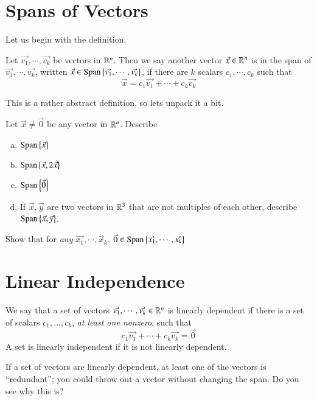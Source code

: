 \section{Spans of Vectors}

Let us begin with the definition.
\begin{Def}
  Let $\vec{v_1},\cdots,\vec{v_k}$ be vectors in $\mathbb{R}^n$.
  Then we say another vector $\vec{x}\in\mathbb{R}^n$ is in the span of $\vec{v_1},\cdots,\vec{v_k}$, written $\vec{x}\in\operatorname{Span}\nolimits\left\{\vec{v_1},\cdots,\vec{v_k}\right\}$, if there are $k$ scalars $c_1,\cdots, c_k$ such that 
  \[\vec{x} = c_1\vec{v_1}+\cdots+c_k\vec{v_k}\]
\end{Def}

This is a rather abstract definition, so lets unpack it a bit.
\begin{EasyEx}
  Let $\vec{x}\ne \vec{0}$ be any vector in $\mathbb{R}^n$.  Describe
  \begin{enumerate}[a)]
  \item $\operatorname{Span}\nolimits\left\{\vec{x}\right\}$
  \item $\operatorname{Span}\nolimits\left\{\vec{x},2\vec{x}\right\}$
  \item $\operatorname{Span}\nolimits\left\{\vec{0}\right\}$
  \item If $\vec{x},\vec{y}$ are two vectors in $\mathbb{R}^3$ that are not multiples of each other, describe $\operatorname{Span}\nolimits\left\{\vec{x},\vec{y}\right\}$.  
  \end{enumerate}
\end{EasyEx}

\begin{EasyEx}
  Show that for \emph{any} $\vec{x_1},\cdots,\vec{x}_k$, $\vec{0}\in\operatorname{Span}\nolimits\left\{\vec{x_1},\cdots,\vec{x_k}\right\}$
\end{EasyEx}

\section{Linear Independence}

\begin{Def}
  We say that a set of vectors $\vec{v_1},\cdots,\vec{v_k}\in\mathbb{R}^n$ is linearly dependent if there is a set of scalars $c_1,...,c_k$, \emph{at least one nonzero}, such that
  \[c_1\vec{v_1}+\cdots+c_k\vec{v_k} = \vec{0}\]
  A set is linearly independent if it is not linearly dependent.  
\end{Def}

\begin{Remark}
  \label{sec:redundant}
  If a set of vectors are linearly dependent, at least one of the vectors is ``redundant''; you could throw out a vector without changing the span.  
  Do you see why this is?
\end{Remark}

